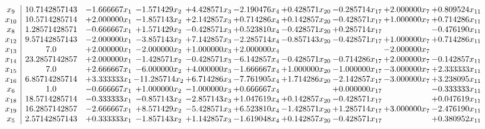 \documentclass[10pt]{article}
\begin{document}
 \[\begin{array}{c| c c@{\hskip 2pt} c@{\hskip 2pt} c@{\hskip 2pt} c@{\hskip 2pt} c@{\hskip 2pt} c@{\hskip 2pt} c@{\hskip 2pt} c@{\hskip 2pt} }
 x_{9}   &  10.7142857143 & -1.666667 x_{1} & -1.571429 x_{2} & + 4.428571 x_{3} & -2.190476 x_{4} & + 0.428571 x_{20} & -0.285714 x_{17} & + 2.000000 x_{7} & + 0.809524 x_{11}\\
 x_{10}   &  10.5714285714 & + 2.000000 x_{1} & -1.857143 x_{2} & + 2.142857 x_{3} & + 0.714286 x_{4} & + 0.142857 x_{20} & -0.428571 x_{17} & + 1.000000 x_{7} & + 0.714286 x_{11}\\
 x_{8}   &  1.28571428571 & -0.666667 x_{1} & + 1.571429 x_{2} & -0.428571 x_{3} & + 0.523810 x_{4} & -0.428571 x_{20} & + 0.285714 x_{17} &   & -0.476190 x_{11}\\
 x_{12}   &  9.57142857143 & -2.000000 x_{1} & -3.857143 x_{2} & + 7.142857 x_{3} & -2.285714 x_{4} & -0.857143 x_{20} & -0.428571 x_{17} & + 1.000000 x_{7} & + 0.714286 x_{11}\\
 x_{13}   &  7.0 & + 2.000000 x_{1} & -2.000000 x_{2} & + 1.000000 x_{3} & + 2.000000 x_{4} &    &   & -2.000000 x_{7} &   \\
 x_{14}   &  23.2857142857 & + 2.000000 x_{1} & -1.428571 x_{2} & -0.428571 x_{3} & -6.142857 x_{4} & -0.428571 x_{20} & -0.714286 x_{17} & + 2.000000 x_{7} & -0.142857 x_{11}\\
 x_{15}   &  7.0 & + 2.666667 x_{1} & -6.000000 x_{2} & + 4.000000 x_{3} & -1.666667 x_{4} & + 1.000000 x_{20} & -1.000000 x_{17} & -3.000000 x_{7} & + 2.333333 x_{11}\\
 x_{16}   &  6.85714285714 & + 3.333333 x_{1} & -11.285714 x_{2} & + 6.714286 x_{3} & -7.761905 x_{4} & + 1.714286 x_{20} & -2.142857 x_{17} & -3.000000 x_{7} & + 3.238095 x_{11}\\
 x_{6}   &  1.0 & -0.666667 x_{1} & + 1.000000 x_{2} & -1.000000 x_{3} & + 0.666667 x_{4} &   & + 0.000000 x_{17} &   & -0.333333 x_{11}\\
 x_{18}   &  18.5714285714 & -0.333333 x_{1} & -0.857143 x_{2} & -2.857143 x_{3} & + 1.047619 x_{4} & + 0.142857 x_{20} & -0.428571 x_{17} &   & + 0.047619 x_{11}\\
 x_{19}   &  16.2857142857 & -2.666667 x_{1} & + 8.571429 x_{2} & -5.428571 x_{3} & + 6.523810 x_{4} & -1.428571 x_{20} & + 1.285714 x_{17} & + 3.000000 x_{7} & -2.476190 x_{11}\\
 x_{5}   &  2.57142857143 & + 0.333333 x_{1} & -1.857143 x_{2} & + 1.142857 x_{3} & -1.619048 x_{4} & + 0.142857 x_{20} & -0.428571 x_{17} &   & + 0.380952 x_{11}\\

\end{array}\]
\end{document}
